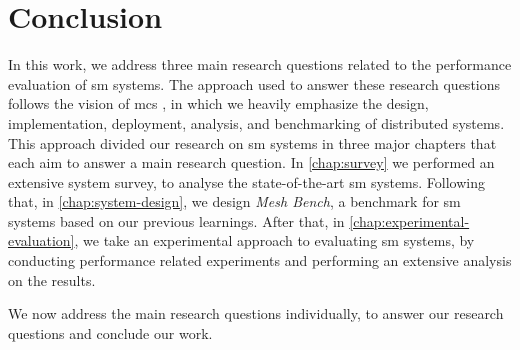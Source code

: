 \section{Conclusion}
\label{sec:conclusion:conclusion}

In this work, we address three main research questions related to the performance evaluation of \gls{sm} systems. The approach used to answer these research questions follows the vision of \gls{mcs} \cite{Iosup2018}, in which we heavily emphasize the design, implementation, deployment, analysis, and benchmarking of distributed systems. This approach divided our research on \gls{sm} systems in three major chapters that each aim to answer a main research question. In \cref{chap:survey} we performed an extensive system survey, to analyse the state-of-the-art \gls{sm} systems. Following that, in  \cref{chap:system-design}, we design \textit{Mesh Bench}, a benchmark for \gls{sm} systems based on our previous learnings. After that, in \cref{chap:experimental-evaluation}, we take an experimental approach to evaluating \gls{sm} systems, by conducting performance related experiments and performing an extensive analysis on the results.

We now address the main research questions individually, to answer our research questions and conclude our work.


